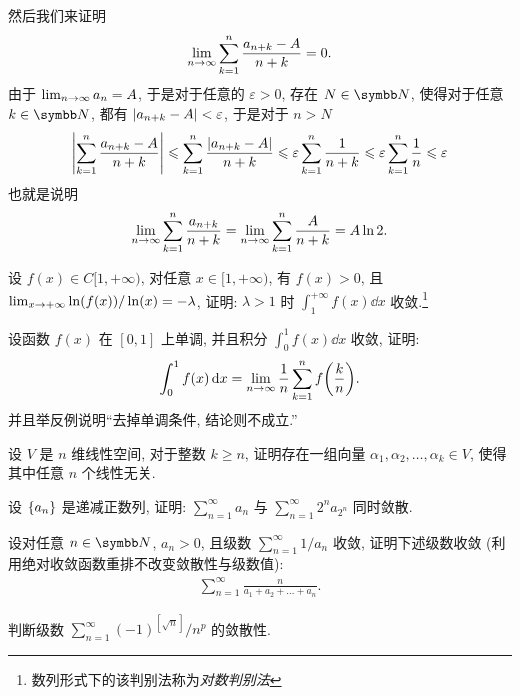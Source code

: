 \documentclass{ctexart}
\begin{document}
\begin{exercise}[series=exer]
\begin{answer}
        然后我们来证明 
        \begin{align*}
            \lim_{n \to \infty}\sum_{k = 1}^{n} \frac{a_{n + k} - A}{n + k} = 0.
        \end{align*}
        由于 $ \lim_{n \to \infty}a_{n} = A $, 于是对于任意的 $ \varepsilon > 0 $, 存在 $ N \in \N $, 使得对于任意 $ k \in \N $, 都有 $ \abs{a_{n + k} - A} < \varepsilon $, 于是对于 $ n > N $ 
        \begin{align*}
            \abs{\sum_{k = 1}^{n} \frac{a_{n + k} - A}{n + k}} \leqslant \sum_{k = 1}^{n} \frac{\abs{a_{n + k} - A}}{n + k} \leqslant \varepsilon \sum_{k = 1}^{n} \frac{1}{n + k} \leqslant \varepsilon\sum_{k = 1}^{n} \frac{1}{n} \leqslant \varepsilon
        \end{align*}
        也就是说明 
        \begin{align*}
            \lim_{n \to \infty} \sum_{k = 1}^{n}\frac{a_{n + k}}{n + k} = \lim_{n \to \infty} \sum_{k = 1}^{n}\frac{A}{n + k} = A\ln 2.
        \end{align*}
    \end{answer}
    \item 设 $ f(x) \in C[1, +\infty) $, 对任意 $ x\in [1, +\infty) $, 有 $ f(x) > 0 $, 且 $ \lim_{x \to +\infty} \ln(f(x))/\ln(x) = -\lambda $, 证明: $ \lambda > 1 $ 时 $ \int_{1}^{+\infty} f(x) \dd{x} $ 收敛.\footnote{数列形式下的该判别法称为\emph{对数判别法}}
    \item 设函数 $ f(x) $ 在 $ [0, 1] $ 上单调, 并且积分 $ \int_{0}^{1} f(x) \dd{x} $ 收敛, 证明:
    \begin{align*}
        \int_{0}^{1} f(x) \dd{x} = \lim_{n \to \infty} \frac{1}{n} \sum_{k=1}^{n} f\qty(\frac{k}{n}).
    \end{align*}
    并且举反例说明``去掉单调条件, 结论则不成立.''
    \item 设 $ V $ 是 $ n $ 维线性空间, 对于整数 $ k \ge n $, 证明存在一组向量 $ \alpha_{1}, \alpha_{2}, \dots, \alpha_{k} \in V $, 使得其中任意 $ n $ 个线性无关.
    \item 设 $ \qty{a_{n}} $ 是递减正数列, 证明: $ \sum_{n=1}^{\infty}a_{n} $ 与 $ \sum_{n=1}^{\infty}2^{n}a_{2^{n}} $ 同时敛散.
    \item 设对任意 $ n\in \N $, $ a_{n} > 0 $, 且级数 $ \sum_{n=1}^{\infty}1/a_{n} $ 收敛, 证明下述级数收敛 (利用绝对收敛函数重排不改变敛散性与级数值):
    \begin{align*}
        \sum_{n=1}^{\infty}\frac{n}{a_{1} + a_{2} + \dots + a_{n}}.
    \end{align*}
    \item 判断级数 $ \sum_{n=1}^{\infty} (-1)^{[\sqrt{n}]}/n^{p} $ 的敛散性.

\end{exercise}
\end{document}
